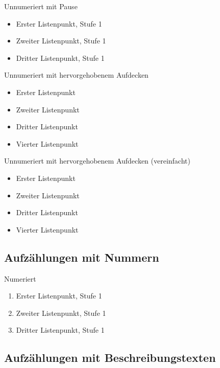 \documentclass[t, aspectratio=169, ngerman]{beamer}
\begin{document}
	\begin{frame}{Unnumeriert mit Pause}
		\begin{itemize}
			\item Erster Listenpunkt, Stufe 1
				\pause
			\item Zweiter Listenpunkt, Stufe 1
				\pause
			\item Dritter Listenpunkt, Stufe 1
		\end{itemize}
	\end{frame}

	\begin{frame}{Unnumeriert mit hervorgehobenem Aufdecken}
		\begin{itemize}
			\item<+-| alert@+> Erster Listenpunkt
			\item<+-| alert@+> Zweiter Listenpunkt
			\item<+-| alert@+> Dritter Listenpunkt
			\item<+-| alert@+> Vierter Listenpunkt
		\end{itemize}
	\end{frame}

	\begin{frame}{Unnumeriert mit hervorgehobenem Aufdecken (vereinfacht)}
		\begin{itemize}[<+-| alert@+>]
			\item Erster Listenpunkt
			\item Zweiter Listenpunkt
			\item Dritter Listenpunkt
			\item Vierter Listenpunkt
		\end{itemize}
	\end{frame}

	\subsection{Aufzählungen mit Nummern}

	\begin{frame}{Numeriert}
		\begin{enumerate}
			\item Erster Listenpunkt, Stufe 1
			\item Zweiter Listenpunkt, Stufe 1
			\item Dritter Listenpunkt, Stufe 1
		\end{enumerate}
	\end{frame}

	\subsection{Aufzählungen mit Beschreibungstexten}
\end{document}
